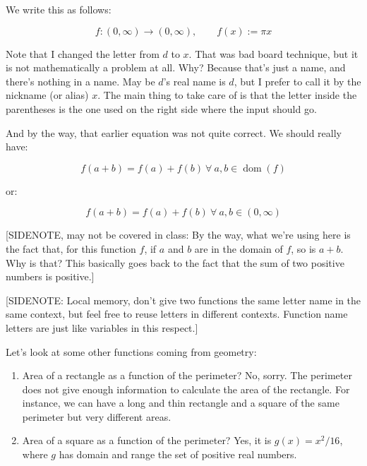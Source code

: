 \documentclass{amsart}
\begin{document}
We write this as follows:

\begin{equation*}
  f: (0,\infty) \to (0,\infty), \qquad f(x) := \pi x
\end{equation*}

Note that I changed the letter from $d$ to $x$. That was bad board
technique, but it is not mathematically a problem at all. Why? Because
that's just a name, and there's nothing in a name. May be $d$'s real
name is $d$, but I prefer to call it by the nickname (or alias)
$x$. The main thing to take care of is that the letter inside the
parentheses is the one used on the right side where the input should
go.

And by the way, that earlier equation was not quite correct. We should
really have:

\begin{equation*}
  f(a + b) = f(a) + f(b) \ \forall \ a,b \in \operatorname{dom}(f)
\end{equation*}

or:

\begin{equation*}
  f(a + b) = f(a) + f(b) \ \forall \ a,b \in (0,\infty)
\end{equation*}

[SIDENOTE, may not be covered in class: By the way, what we're using
here is the fact that, for this function $f$, if $a$ and $b$ are in
the domain of $f$, so is $a + b$. Why is that? This basically goes
back to the fact that the sum of two positive numbers is positive.]

[SIDENOTE: Local memory, don't give two functions the same letter name
in the same context, but feel free to reuse letters in different
contexts. Function name letters are just like variables in this
respect.]

Let's look at some other functions coming from geometry:

\begin{enumerate}

\item Area of a rectangle as a function of the perimeter? No,
  sorry. The perimeter does not give enough information to calculate
  the area of the rectangle. For instance, we can have a long and thin
  rectangle and a square of the same perimeter but very different
  areas.
\item Area of a square as a function of the perimeter? Yes, it is
  $g(x) = x^2/16$, where $g$ has domain and range the set of positive
  real numbers.

\end{enumerate}
\end{document}
